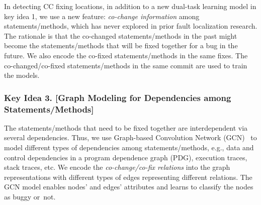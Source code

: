 In detecting CC fixing locations, in addition to a new dual-task
learning model in key idea 1, we use a new feature:
{\em co-change information} among statements/methods, which has never
explored in prior fault localization research. The rationale
is that the co-changed statements/methods in the past might become the
statements/methods that will be fixed together for a bug in the
future. We also encode the co-fixed statements/methods in the same
fixes. The co-changed/co-fixed statements/methods in the same commit
are used to train the models.




\subsubsection{{\bf Key Idea 3. [Graph Modeling for Dependencies among
    Statements/Methods]}}
    
The statements/methods that need to be fixed together are
interdependent via several dependencies. Thus, we use Graph-based
Convolution Network (GCN)~\cite{li2019gcn} to model different types of
dependencies among statements/methods, e.g., data and control
dependencies in a program dependence graph (PDG), execution traces,
stack traces, etc.
We encode the {\em co-change/co-fix relations}
into the graph representations with different types of edges
representing different relations. The GCN model enables nodes'
and edges' attributes and learns to classify the nodes as buggy
or~not.


